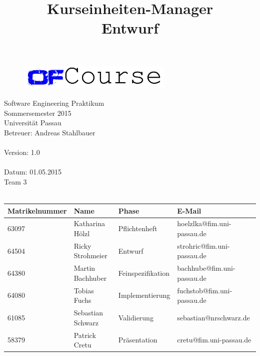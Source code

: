 \documentclass[a4paper, 12pt]{scrreprt}
\begin{document}
	\thispagestyle{plain}

\begin{titlepage}
    \begin{center}
        
        \begin{figure}[ht]
        	\centering
        	\includegraphics[width=0.66\textwidth, angle=0]{logo/name_blau_ofCourse.jpg}
        \end{figure}
        
    	\begin{title}
        	\title{\Huge{\textbf{Kurseinheiten-Manager \\ Entwurf\\}}}

		\end{title}
		\hspace{3cm}

        	Software Engineering Praktikum \\
        	Sommersemester 2015\\
        	Universität Passau\\


        	Betreuer: Andreas Stahlbauer \\
        	\hspace{1,5cm}\\
        	Version: 1.0 \\
        	\hspace{1,5cm}\\
        	Datum: 01.05.2015\\[50pt]
        	Team 3 \\
    
		    \ \\
        
        
        \begin{tabular}{ | l | l | l | l |}
            \hline
             \textbf{Matrikelnummer} & \textbf{Name} & \textbf{Phase} & \textbf{E-Mail}  \\ \hline
             63097 & Katharina Hölzl & Pflichtenheft & hoelzlka@fim.uni-passau.de \\ \hline
             64504 & Ricky Strohmeier& Entwurf & strohric@fim.uni-passau.de  \\ \hline
             64380 & Martin Bachhuber & Feinspezifikation  & bachhube@fim.uni-passau.de \\ \hline
             64080 & Tobias Fuchs & Implementierung  &  fuchstob@fim.uni-passau.de\\ \hline
             61085 & Sebastian Schwarz & Validierung & sebastian@nrschwarz.de \\ \hline  
             58379 & Patrick Cretu  &  Präsentation & cretu@fim.uni-passau.de \\ \hline
        \end{tabular}
        

\end{center}
\end{titlepage}
\end{document}
